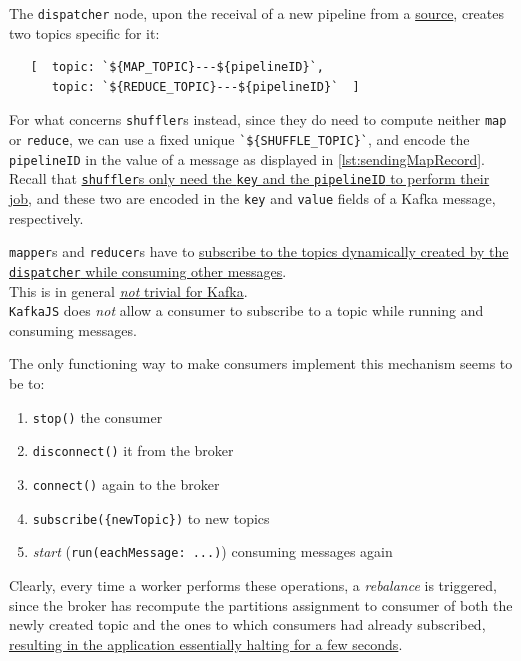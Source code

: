 The \texttt{dispatcher} node, upon the receival of a new pipeline from a \ul{source}, creates two topics specific for it:
\begin{lstlisting}
   [  topic: `${MAP_TOPIC}---${pipelineID}`,
      topic: `${REDUCE_TOPIC}---${pipelineID}`  ]
\end{lstlisting}

For what concerns \texttt{shuffler}s instead, since they do need to compute neither \lstinline|map| or \lstinline|reduce|, we can use a fixed unique \lstinline|`${SHUFFLE_TOPIC}`|, and encode the \lstinline|pipelineID| in the value of a message as displayed in \ref{lst:sendingMapRecord}.\\
Recall that \ul{\texttt{shuffler}s only need the \texttt{key} and the \texttt{pipelineID} to perform their job}, and these two are encoded in the \lstinline|key| and \lstinline|value| fields of a Kafka message, respectively. 

\texttt{mapper}s and \texttt{reducer}s have to \ul{subscribe to the topics dynamically created by the \texttt{dispatcher} while consuming other messages}. \\
This is in general \ul{\textit{not} trivial for Kafka}.\\
\lstinline|KafkaJS| does \textit{not} allow a consumer to subscribe to a topic while running and consuming messages.

{The only functioning way to make consumers implement this mechanism seems to be to:\ns
\begin{enumerate}
   \item \lstinline|stop()| the consumer 
   \item \lstinline|disconnect()| it from the broker
   \item \lstinline|connect()| again to the broker
   \item \lstinline|subscribe({newTopic})| to new topics
   \item \textit{start} (\lstinline|run(eachMessage: ...)|) consuming messages again
\end{enumerate}}

Clearly, every time a worker performs these operations, a \textit{rebalance} is triggered, since the broker has recompute the partitions assignment to consumer of both the newly created topic  and the ones to which consumers had already subscribed,
\ul{resulting in the application essentially halting for a few seconds}.

